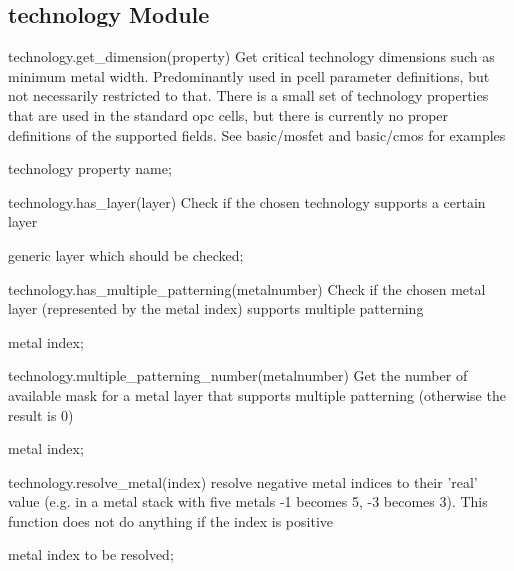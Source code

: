 \subsection{technology Module}
\begin{APIfunc}{technology.get\_dimension(property)}
    Get critical technology dimensions such as minimum metal width. Predominantly used in pcell parameter definitions, but not necessarily restricted to that. There is a small set of technology properties that are used in the standard opc cells, but there is currently no proper definitions of the supported fields. See basic/mosfet and basic/cmos for examples
    \begin{APIparameters}
            technology property name;
    \end{APIparameters}
\end{APIfunc}
\begin{APIfunc}{technology.has\_layer(layer)}
    Check if the chosen technology supports a certain layer
    \begin{APIparameters}
            generic layer which should be checked;
    \end{APIparameters}
\end{APIfunc}
\begin{APIfunc}{technology.has\_multiple\_patterning(metalnumber)}
    Check if the chosen metal layer (represented by the metal index) supports multiple patterning
    \begin{APIparameters}
            metal index;
    \end{APIparameters}
\end{APIfunc}
\begin{APIfunc}{technology.multiple\_patterning\_number(metalnumber)}
    Get the number of available mask for a metal layer that supports multiple patterning (otherwise the result is 0)
    \begin{APIparameters}
            metal index;
    \end{APIparameters}
\end{APIfunc}
\begin{APIfunc}{technology.resolve\_metal(index)}
    resolve negative metal indices to their 'real' value (e.g. in a metal stack with five metals -1 becomes 5, -3 becomes 3). This function does not do anything if the index is positive
    \begin{APIparameters}
            metal index to be resolved;
    \end{APIparameters}
\end{APIfunc}

